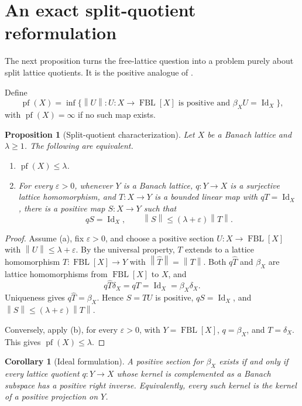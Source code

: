 \documentclass[11pt]{article}
\newtheorem{proposition}[theorem]{Proposition}
\newtheorem{corollary}[theorem]{Corollary}
\newcommand{\FBL}{\operatorname{FBL}}
\newcommand{\Id}{\operatorname{Id}}
\newcommand{\pf}{\operatorname{pf}}
\newcommand{\norm}[1]{\left\lVert #1\right\rVert}
\begin{document}
\section{An exact split-quotient reformulation}

The next proposition turns the free-lattice question into a problem purely
about split lattice quotients.  It is the positive analogue of
\cite[Proposition~2.1]{AvilesEtAl2022}.

Define
\[
 \pf(X)=\inf\bigl\{\norm U:
 U:X\to\FBL[X]\text{ is positive and }\beta_XU=\Id_X\bigr\},
\]
with $\pf(X)=\infty$ if no such map exists.

\begin{proposition}[Split-quotient characterization]\label{prop:split}
Let $X$ be a Banach lattice and $\lambda\geq1$.  The following are equivalent.
\begin{enumerate}[label=(\alph*),leftmargin=2.2em]
\item $\pf(X)\leq\lambda$.
\item For every $\varepsilon>0$, whenever $Y$ is a Banach lattice,
$q:Y\to X$ is a surjective lattice homomorphism, and $T:X\to Y$ is a
bounded linear map with $qT=\Id_X$, there is a positive map $S:X\to Y$
such that
\[
 qS=\Id_X,
 \qquad \norm S\leq(\lambda+\varepsilon)\norm T.
\]
\end{enumerate}
\end{proposition}

\begin{proof}
Assume (a), fix $\varepsilon>0$, and choose a positive section
$U:X\to\FBL[X]$ with $\norm U\leq\lambda+\varepsilon$.  By the universal
property, $T$ extends to a lattice homomorphism
$\widehat T:\FBL[X]\to Y$ with $\norm{\widehat T}=\norm T$.  Both
$q\widehat T$ and $\beta_X$ are lattice homomorphisms from $\FBL[X]$ to $X$,
and
\[
 q\widehat T\delta_X=qT=\Id_X=\beta_X\delta_X.
\]
Uniqueness gives $q\widehat T=\beta_X$.  Hence $S=\widehat TU$ is positive,
$qS=\Id_X$, and $\norm S\leq(\lambda+\varepsilon)\norm T$.

Conversely, apply (b), for every $\varepsilon>0$, with
$Y=\FBL[X]$, $q=\beta_X$, and $T=\delta_X$.  This gives
$\pf(X)\leq\lambda$.
\end{proof}

\begin{corollary}[Ideal formulation]\label{cor:ideal}
A positive section for $\beta_X$ exists if and only if every lattice quotient
$q:Y\to X$ whose kernel is complemented as a Banach subspace has a positive
right inverse.  Equivalently, every such kernel is the kernel of a positive
projection on $Y$.
\end{corollary}
\end{document}
